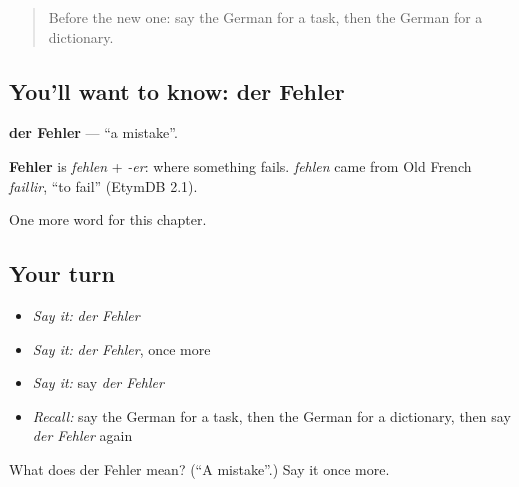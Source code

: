 \label{lesson:GE-C160-fehler}



\begin{quote}
Before the new one: say the German for a task, then the German for a dictionary.
\end{quote}

\subsection*{You'll want to know: der Fehler}
\textbf{der Fehler} — \textquotedblleft{}a mistake\textquotedblright{}.

\begin{cousinweb}
\textbf{Fehler} is \emph{fehlen} + \emph{-er}: where something fails. \emph{fehlen} came from Old French \emph{faillir}, \textquotedblleft{}to fail\textquotedblright{} (EtymDB 2.1).
\end{cousinweb}

\begin{grammarlens}[title={What you've built}]
One more word for this chapter.
\end{grammarlens}

\subsection*{Your turn}
\begin{itemize}
\raggedright
  \item \emph{Say it:} \emph{der Fehler}
  \item \emph{Say it:} \emph{der Fehler}, once more
  \item \emph{Say it:} say \emph{der Fehler}
  \item \emph{Recall:} say the German for a task, then the German for a dictionary, then say \emph{der Fehler} again
\end{itemize}

\begin{tcolorbox}[breakable,colback=teal!4,colframe=teal!35!black,title={Before you move on}]
What does der Fehler mean? (\textquotedblleft{}A mistake\textquotedblright{}.) Say it once more.
\end{tcolorbox}
